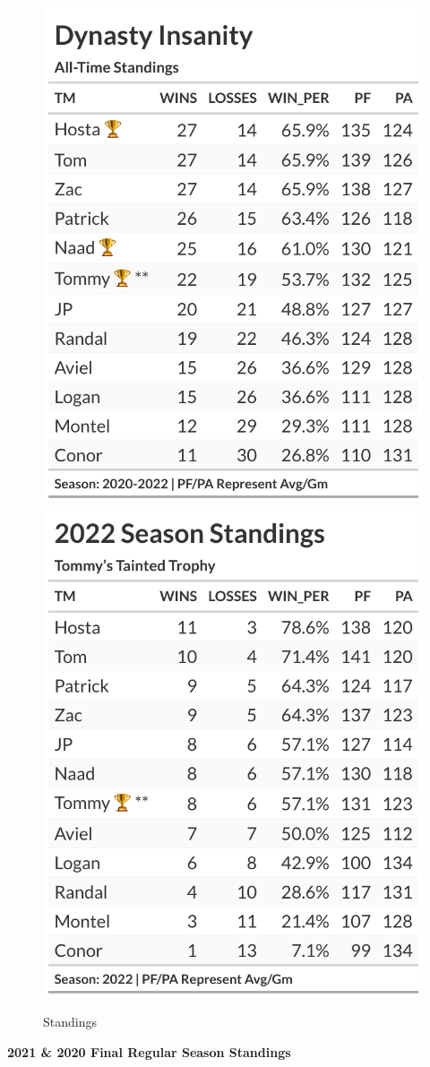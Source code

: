 \documentclass[
]{article}
\begin{document}
\begin{figure}

{\centering \includegraphics[width=0.49\linewidth,height=0.49\textheight]{output/history/all_time_standings} \includegraphics[width=0.49\linewidth,height=0.49\textheight]{output/history/2022_standings} 

}

\caption{Standings}\label{fig:unnamed-chunk-2}
\end{figure}
\newpage

\textbf{2021 \& 2020 Final Regular Season Standings}
\end{document}
